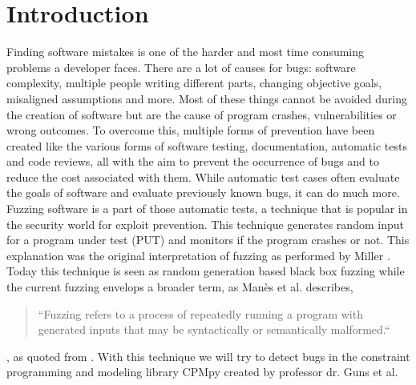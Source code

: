 \chapter{Introduction}
\label{cha:1:intro}
\label{intro:intro}
Finding software mistakes is one of the harder and most time consuming problems a developer faces. There are a lot of causes for bugs: software complexity, multiple people writing different parts, changing objective goals, misaligned assumptions and more. Most of these things cannot be avoided during the creation of software but are the cause of program crashes, vulnerabilities or wrong outcomes. To overcome this, multiple forms of prevention have been created like the various forms of software testing, documentation, automatic tests and code reviews, all with the aim to prevent the occurrence of bugs and to reduce the cost associated with them. While automatic test cases often evaluate the goals of software and evaluate previously known bugs, it can do much more. Fuzzing software is a part of those automatic tests, a technique that is popular in the security world for exploit prevention. This technique generates random input for a program under test (PUT) and monitors if the program crashes or not. This explanation was the original interpretation of fuzzing as performed by Miller \cite{4originalFuzzingUnixUtils}. Today this technique is seen as random generation based black box fuzzing while the current fuzzing envelops a broader term, as Man\`es et al. \cite{13manes2019survey} describes,
\begin{quote}
“Fuzzing refers to a process of repeatedly running a program with generated inputs that may be syntactically or semantically malformed.“
\end{quote}, as quoted from \cite{13manes2019survey}.
With this technique we will try to detect bugs in the constraint programming and modeling library CPMpy \cite{17guns2019increasing} created by professor dr. Guns et al.

